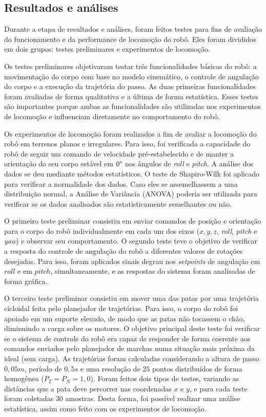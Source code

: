 \documentclass[../main.tex]{subfiles}
\begin{document}
  \subsection{Resultados e análises}
  \label{sec:method_results_analysis}
  Durante a etapa de resultados e análises, foram feitos testes para fins de avaliação do funcionamento e da performance de locomoção do robô. Eles foram divididos em dois grupos: testes preliminares e experimentos de locomoção. 
  
  Os testes preliminares objetivaram testar três funcionalidades básicas do robô: a movimentação do corpo com base no modelo cinemático, o controle de angulação do corpo e a execução da trajetória do passo. As duas primeiras funcionalidades foram avaliadas de forma qualitativa e a última de forma estatística. Esses testes são importantes porque ambas as funcionalidades são utilizadas nos experimentos de locomoção e influenciam diretamente no comportamento do robô. 

  Os experimentos de locomoção foram realizados a fim de avaliar a locomoção do robô em terrenos planos e irregulares. Para isso, foi verificada a capacidade do robô de seguir um comando de velocidade pré-estabelecido e de manter a orientação do seu corpo estável em $0\degree$ nos ângulos de \textit{roll} e \textit{pitch}. A análise dos dados se deu mediante métodos estatísticos. O teste de Shapiro-Wilk \cite{leotti2005comparaccao} foi aplicado para verificar a normalidade dos dados. Caso eles se assemelhassem a uma distribuição normal, a Análise de Variância (ANOVA) \cite{cano2012six} poderia ser utilizada para verificar se os dados analisados são estatisticamente semelhantes ou não.

  O primeiro teste preliminar consistiu em enviar comandos de posição e orientação para o corpo do robô individualmente em cada um dos eixos ($x, y, z$, \textit{roll}, \textit{pitch} e \textit{yaw}) e observar seu comportamento. O segundo teste teve o objetivo de verificar a resposta do controle de angulação do robô a diferentes valores de rotações desejadas. Para isso, foram aplicados sinais degrau nos \textit{setpoints} de angulação em $roll$ e em $pitch$, simultaneamente, e as respostas do sistema foram analisadas de forma gráfica.
  
  O terceiro teste preliminar consistiu em mover uma das patas por uma trajetória cicloidal feita pelo planejador de trajetórias. Para isso, o corpo do robô foi apoiado em um suporte elevado, de modo que as patas não tocassem o chão, diminuindo a carga sobre os motores. O objetivo principal deste teste foi verificar se o sistema de controle do robô era capaz de responder de forma coerente aos comandos enviados pelo planejador de marchas numa situação mais próxima da ideal (sem carga). As trajetórias foram calculadas considerando a altura de passo $0,05 m$, período de $0,5 s$ e uma resolução de $25$ pontos distribuídos de forma homogênea ($P_T = P_N = 1,0$). Foram feitos dois tipos de testes, variando as distâncias que a pata deve percorrer nas coordenadas $x$ e $y$, e para cada teste foram coletadas 30 amostras. Desta forma, foi possível realizar uma análise estatística, assim como feito com os experimentos de locomoção.
  
\end{document}
